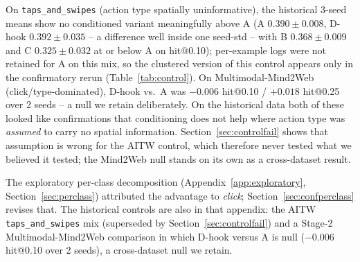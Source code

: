 {On \texttt{taps\_and\_swipes} (action type spatially uninformative), the
historical 3-seed means show no conditioned variant meaningfully above A
(A $0.390{\pm}0.008$, D-hook $0.392{\pm}0.035$ -- a difference well inside
one seed-std -- with B $0.368{\pm}0.009$ and C $0.325{\pm}0.032$ at or
below A on hit@0.10); per-example logs were not retained for A on
this mix, so the clustered version of this control appears only in the
confirmatory rerun (Table~\ref{tab:control}). On Multimodal-Mind2Web
(click/type-dominated), D-hook vs.\ A was $-0.006$ hit@0.10 / $+0.018$
hit@0.25 over 2 seeds -- a null we retain deliberately. On the historical
data both of these looked like confirmations that conditioning does not
help where action type was \emph{assumed} to carry no spatial information.
Section~\ref{sec:controlfail} shows that assumption is wrong for the AITW
control, which therefore never tested what we believed it tested; the
Mind2Web null stands on its own as a cross-dataset result.

}
\ifworkshopbuild The exploratory per-class decomposition (Appendix~\ref{app:exploratory},
Section~\ref{sec:perclass}) attributed the advantage to \emph{click};
Section~\ref{sec:confperclass} revises that. The historical controls are
also in that appendix: the AITW \texttt{taps\_and\_swipes} mix (superseded
by Section~\ref{sec:controlfail}) and a Stage-2 Multimodal-Mind2Web
comparison in which D-hook versus A is null ($-0.006$ hit@0.10 over 2
seeds), a cross-dataset null we retain.
\else\expperclass\fi

